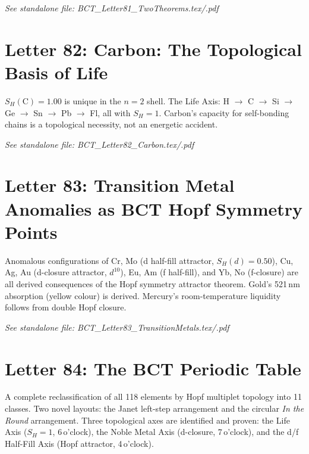 \documentclass[aps,preprint,superscriptaddress,floatfix]{revtex4-2}
\begin{document}
\textit{See standalone file: BCT\_Letter81\_TwoTheorems.tex/.pdf}

\newpage
\section*{Letter 82: Carbon: The Topological Basis of Life}

$S_H(\mathrm{C}) = 1.00$ is unique in the $n=2$ shell.
The Life Axis: H $\to$ C $\to$ Si $\to$ Ge $\to$ Sn $\to$
Pb $\to$ Fl, all with $S_H = 1$. Carbon's capacity for
self-bonding chains is a topological necessity, not an
energetic accident.

\textit{See standalone file: BCT\_Letter82\_Carbon.tex/.pdf}

\newpage
\section*{Letter 83: Transition Metal Anomalies as BCT Hopf Symmetry Points}

Anomalous configurations of Cr, Mo (d half-fill attractor,
$S_H(d) = 0.50$), Cu, Ag, Au (d-closure attractor, $d^{10}$),
Eu, Am (f half-fill), and Yb, No (f-closure) are all derived
consequences of the Hopf symmetry attractor theorem.
Gold's 521\,nm absorption (yellow colour) is derived.
Mercury's room-temperature liquidity follows from double
Hopf closure.

\textit{See standalone file: BCT\_Letter83\_TransitionMetals.tex/.pdf}

\newpage
\section*{Letter 84: The BCT Periodic Table}

A complete reclassification of all 118 elements by Hopf
multiplet topology into 11 classes. Two novel layouts:
the Janet left-step arrangement and the circular
\textit{In the Round} arrangement. Three topological axes
are identified and proven: the Life Axis ($S_H = 1$,
6\,o'clock), the Noble Metal Axis (d-closure, 7\,o'clock),
and the d/f Half-Fill Axis (Hopf attractor, 4\,o'clock).
\end{document}
